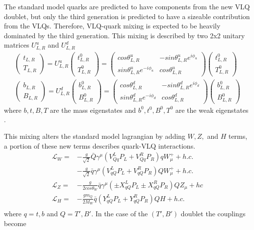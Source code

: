 The standard model quarks are predicted to have components from the new VLQ doublet, but only the third generation is predicted to have a sizeable contribution from the VLQs. Therefore, VLQ-quark mixing is expected to be heavily dominated by the third generation. This mixing is described by two 2x2 unitary matrices $U^{u}_{L,R}$ and $U^{d}_{L,R}$
\begin{align}
    \begin{pmatrix} t_{L,R} \\ T_{L,R} \end{pmatrix} = U^{u}_{L,R} 
    \begin{pmatrix} t^{0}_{L,R} \\ T^{0}_{L,R} \end{pmatrix}
    =
    \begin{pmatrix} cos\theta^{u}_{L,R} & -sin\theta^{u}_{L,R}e^{i\phi_{u}} \\ sin\theta^{u}_{L,R}e^{-i\phi_{u}} & cos\theta^{u}_{L,R} \end{pmatrix}
    \begin{pmatrix}t^{0}_{L,R} \\ T^{0}_{L,R} \end{pmatrix} \\
    \begin{pmatrix} b_{L,R} \\ B_{L,R} \end{pmatrix} = U^{d}_{L,R} 
    \begin{pmatrix} b^{0}_{L,R} \\ B^{0}_{L,R} \end{pmatrix}
    =
    \begin{pmatrix} cos\theta^{d}_{L,R} & -sin\theta^{d}_{L,R}e^{i\phi_{d}} \\ sin\theta^{d}_{L,R}e^{-i\phi_{d}} & cos\theta^{d}_{L,R} \end{pmatrix}
    \begin{pmatrix}b^{0}_{L,R} \\ B^{0}_{L,R} \end{pmatrix} 
\end{align}
where $b,t,B,T$ are the mass eigenstates and $b^{0},t^{0},B^{0},T^{0}$ are the weak eigenstates \cite{VLQHandbook}.

This mixing alters the standard model lagrangian by adding $W,Z,$ and $H$ terms, a portion of these new terms describes quark-VLQ interactions.
\begin{align*}
    \mathcal{L}_{W} = &-\frac{g}{\sqrt{2}} \bar{Q}\gamma^{\mu}(V^{L}_{Qq}P_{L} + V^{R}_{Qq}P_{R})qW^{+}_{\mu} 
    + h.c. \\
    &-\frac{g}{\sqrt{2}}
    \bar{q}\gamma^{\mu}(V^{L}_{qQ}P_{L} + V^{R}_{qQ}P_{R})QW^{+}_{\mu}
    + h.c. \\
    \mathcal{L}_{Z} = &-\frac{g}{2cos\theta_{W}}\bar{q}\gamma^{\mu} (\pm X^{L}_{qQ}P_{L} \pm X^{R}_{qQ}P_{R})QZ_{\mu}
    + hc \\
    \mathcal{L}_{H} = &-\frac{gm_{Q}}{2M_{W}}\bar{q}(Y^{L}_{qQ}P_{L} + Y^{R}_{qQ}P_{R})QH + h.c. \\ 
\end{align*}
where $q=t,b$ and $Q=T',B'$. In the case of the $(T', B')$ doublet the couplings become

